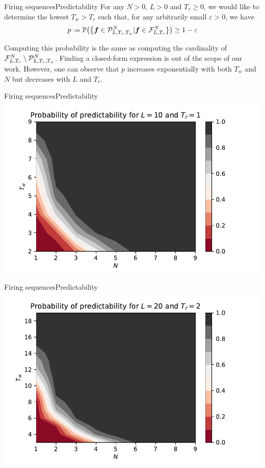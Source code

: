 \documentclass{beamer}
\begin{document}
	\begin{frame}{Firing sequences}{Predictability}
		\justifying
		For any $N > 0$, $L > 0$ and $T_r \geq 0$, we would like to determine the lowest $T_w > T_r$ such that, for any arbitrarily small $\varepsilon > 0$, we have
		\begin{equation*}
			p := \mathbb{P} \!\left(\left\{\bm{f} \in \mathcal{P}_{L, T_r, T_w}^N | \bm{f} \in \mathcal{F}_{L, T_r}^N\right\}\right) \geq 1 - \varepsilon
		\end{equation*}

		Computing this probability is the same as computing the cardinality of $\mathcal{F}_{L, T_r}^N \setminus \mathcal{P}_{L, T_r, T_w}^N$. Finding a closed-form expression is out of the scope of our work. However, one can observe that $p$ increases exponentially with both $T_w$ and $N$ but decreases with $L$ and $T_r$.
	\end{frame}

	\begin{frame}{Firing sequences}{Predictability}
		\justifying
		\includegraphics[width=\textwidth]{predictability_10_1.pdf}
	\end{frame}

	\begin{frame}{Firing sequences}{Predictability}
		\justifying
		\includegraphics[width=\textwidth]{predictability_20_2.pdf}
	\end{frame}
\end{document}
